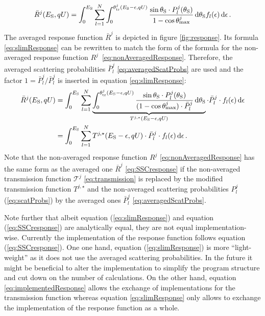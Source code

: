 \begin{equation}
    \label{eq:slimResponse}
    \bar{R}^j(E_\mathrm{S}, qU) =
    \int_0^{E_\mathrm{S}}
        \sum_{l=1}^{N}
            \int_{0}^{\theta^j_\mathrm{tr}(E_\mathrm{S}-\epsilon, qU)}
            \frac{
                \sin\theta_\mathrm{S} \cdot P^j_l(\theta_\mathrm{S})
            }{
                1-\cos\theta_\mathrm{max}^j
            }
            \mathop{}\!\mathrm{d} \theta_\mathrm{S}
            f_l(\epsilon)
    \mathop{}\!\mathrm{d} \epsilon
    \text{\,.}
\end{equation}
The averaged response function $\bar{R}^j$ is depicted in figure \ref{fig:response}. Its formula \eqref{eq:slimResponse} can be rewritten to match the form of the formula for the non-averaged response function \mbox{$R^j$ \eqref{eq:nonAveragedResponse}}. Therefore, the averaged scattering probabilities $\bar{P}^j_l$ \eqref{eq:averagedScatProbs} are used and the factor $1 = \bar{P}^j_l / \bar{P}^j_l$ is inserted in equation \eqref{eq:slimResponse}:
\begin{align}
    \label{eq:implementedResponse}
    \bar{R}^j(E_\mathrm{S}, qU) &=
    \int_0^{E_\mathrm{S}}
        \sum_{l=1}^{N}
            \underbrace{
                \int_{0}^{\theta^j_\mathrm{tr}(E_\mathrm{S}-\epsilon, qU)}
                \frac{
                    \sin\theta_\mathrm{S} \cdot P^j_l(\theta_\mathrm{S})
                }{
                    (1-\cos\theta_\mathrm{max}^j) \cdot \bar{P}^j_l
                }
                \mathop{}\!\mathrm{d} \theta_\mathrm{S}
            }_{
                T^{j,\star}(E_\mathrm{S}-\epsilon, qU)
            } \cdot 
            \bar{P}^j_l \cdot
            f_l(\epsilon)
    \mathop{}\!\mathrm{d} \epsilon \\ &=
    \int_0^{E_\mathrm{S}}
        \sum_{l=1}^{N}
            T^{j,\star}(E_\mathrm{S}-\epsilon, qU) \cdot 
            \bar{P}^j_l \cdot
            f_l(\epsilon)
    \mathop{}\!\mathrm{d} \epsilon
    \label{eq:SSCresponse}
    \text{\,.}
\end{align}
Note that the non-averaged response function $R^j$ \eqref{eq:nonAveragedResponse} has the same form as the averaged one $\bar{R}^j$ \eqref{eq:SSCresponse} if the non-averaged transmission function $\mathcal{T}^j$ \eqref{eq:transmission} is replaced by the modified transmission function $T^{j,\star}$ and the non-averaged scattering probabilities $P^j_l$ (\ref{eq:scatProbs}) by the averaged ones $\bar{P}^j_l$ \eqref{eq:averagedScatProbs}.

Note further that albeit equation (\ref{eq:slimResponse}) and equation (\ref{eq:SSCresponse}) are analytically equal, they are not equal implementation-wise. Currently the implementation of the response function follows equation (\ref{eq:SSCresponse}). One one hand, equation (\ref{eq:slimResponse}) is more ``light-weight'' as it does not use the averaged scattering probabilities. In the future it might be beneficial to alter the implementation to simplify the program structure and cut down on the number of calculations. On the other hand, equation \eqref{eq:implementedResponse} allows the exchange of implementations for the transmission function whereas equation \eqref{eq:slimResponse} only allows to exchange the implementation of the response function as a whole.

